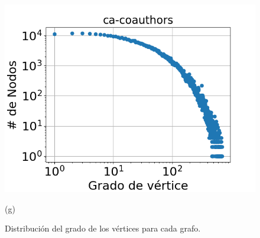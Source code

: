 \begin{figure}[p]
%    			
%    			
    	
    	\begin{minipage}{0.45\textwidth}
    		\centering
    		\includegraphics[width=1\linewidth]{img/grades/ca-coauthors.png}
    		
    		(g)
    	\end{minipage}  
    \caption{Distribución del grado de los vértices para cada grafo.}
    \label{fig:grades}
\end{figure}
